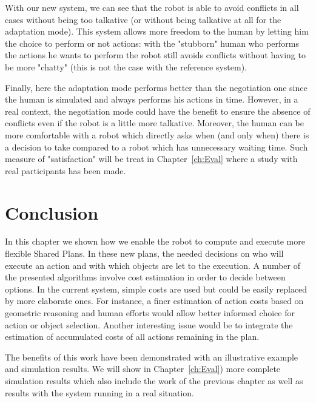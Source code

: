 \documentclass[english,a4paper,11pt,twoside]{StyleThese}
\begin{document}
With our new system, we can see that the robot is able to avoid conflicts in all cases without being too talkative (or without being talkative at all for the adaptation mode). This system allows more freedom to the human by letting him the choice to perform or not actions: with the "stubborn" human who performs the actions he wants to perform the robot still avoids conflicts without having to be more "chatty" (this is not the case with the reference system).

Finally, here the adaptation mode performs better than the negotiation one since the human is simulated and always performs his actions in time. However, in a real context, the negotiation mode could have the benefit to ensure the absence of conflicts even if the robot is a little more talkative. Moreover, the human can be more comfortable with a robot which directly asks when (and only when) there is a decision to take compared to a robot which has unnecessary waiting time. Such measure of "satisfaction" will be treat in Chapter~\ref{ch:Eval} where a study with real participants has been made.

\section{Conclusion}

In this chapter we shown how we enable the robot to compute and execute more flexible Shared Plans. In these new plans, the needed decisions on who will execute an action and with which objects are let to the execution. A number of the presented algorithms involve cost estimation in order to decide between options. In the current system, simple costs are used but could be easily replaced by more elaborate ones. For instance, a finer estimation of action costs based on geometric reasoning and human efforts would allow better informed choice for action or object selection. Another interesting issue would be to integrate the estimation of accumulated costs of all actions remaining in the plan.

The benefits of this work have been demonstrated with an illustrative example and simulation results. We will show in Chapter~\ref{ch:Eval}) more complete simulation results which also include the work of the previous chapter as well as results with the system running in a real situation.


\ifdefined{}
\else


\end{document}

